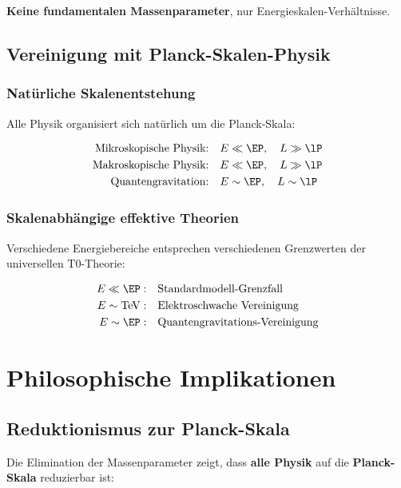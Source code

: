 	\textbf{Keine fundamentalen Massenparameter}, nur Energieskalen-Verhältnisse.
	
	\subsection{Vereinigung mit Planck-Skalen-Physik}
	\label{subsec:planck_unification}
	
	\subsubsection{Natürliche Skalenentstehung}
	
	Alle Physik organisiert sich natürlich um die Planck-Skala:
	
	\begin{align}
		\text{Mikroskopische Physik:} \quad &E \ll \EP, \quad L \gg \lP \\
		\text{Makroskopische Physik:} \quad &E \ll \EP, \quad L \gg \lP \\
		\text{Quantengravitation:} \quad &E \sim \EP, \quad L \sim \lP
	\end{align}
	
	\subsubsection{Skalenabhängige effektive Theorien}
	
	Verschiedene Energiebereiche entsprechen verschiedenen Grenzwerten der universellen T0-Theorie:
	
	\begin{align}
		E \ll \EP: \quad &\text{Standardmodell-Grenzfall} \\
		E \sim \text{TeV}: \quad &\text{Elektroschwache Vereinigung} \\
		E \sim \EP: \quad &\text{Quantengravitations-Vereinigung}
	\end{align}
	
	\section{Philosophische Implikationen}
	\label{sec:philosophical}
	
	\subsection{Reduktionismus zur Planck-Skala}
	\label{subsec:reductionism}
	
	Die Elimination der Massenparameter zeigt, dass \textbf{alle Physik} auf die \textbf{Planck-Skala} reduzierbar ist:
	
